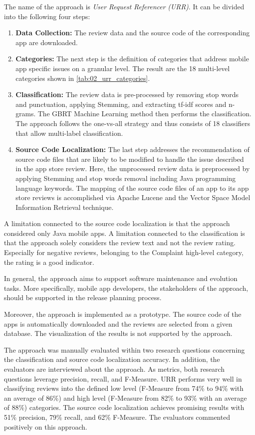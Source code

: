 The name of the approach is \textit{User Request Referencer (URR)}. It can be divided into the following four steps:

\begin{enumerate}
    \item \textbf{Data Collection:} The review data and the source code of the corresponding app are downloaded.
    \item \textbf{Categories:} The next step is the definition of categories that address mobile app specific issues on a granular level. The result are the 18 multi-level categories shown in \autoref{tab:02_urr_categories}.
    \item \textbf{Classification:} The review data is pre-processed by removing stop words and punctuation, applying Stemming, and extracting tf-idf scores and n-grams. The GBRT Machine Learning method then performs the classification. The approach follows the one-vs-all strategy and thus consists of 18 classifiers that allow multi-label classification.  
    \item \textbf{Source Code Localization:} The last step addresses the recommendation of source code files that are likely to be modified to handle the issue described in the app store review. Here, the unprocessed review data is preprocessed by applying Stemming and stop words removal including Java programming language keywords. The mapping of the source code files of an app to its app store reviews is accomplished via Apache Lucene and the Vector Space Model Information Retrieval technique.
\end{enumerate}

A limitation connected to the source code localization is that the approach considered only Java mobile apps. A limitation connected to the classification is that the approach solely considers the review text and not the review rating. Especially for negative reviews, belonging to the Complaint high-level category, the rating is a good indicator. 

In general, the approach aims to support software maintenance and evolution tasks. More specifically, mobile app developers, the stakeholders of the approach, should be supported in the release planning process. 

Moreover, the approach is implemented as a prototype. The source code of the apps is automatically downloaded and the reviews are selected from a given database. The visualization of the results is not supported by the approach.

The approach was manually evaluated within two research questions concerning the classification and source code localization accuracy. In addition, the evaluators are interviewed about the approach. As metrics, both research questions leverage precision, recall, and F-Measure. URR performs very well in classifying reviews into the defined low level (F-Measure from 74\% to 94\% with an average of 86\%) and high level (F-Measure from 82\% to 93\% with an average of 88\%) categories. The source code localization achieves promising results with 51\% precision, 79\% recall, and 62\% F-Measure. The evaluators commented positively on this approach.


